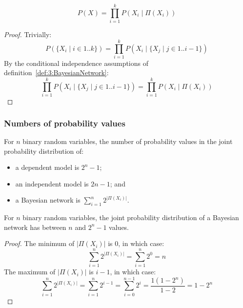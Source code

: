 \begin{thm}
  \label{thm:3:BayesianNetworkJPD}
  \begin{equation}
    P(X) = \prod_{i = 1}^{k} P(X_i \mid \Pi(X_i))
  \end{equation}
  \begin{proof}
    Trivially:
    \begin{equation}
      P(\{ X_i \mid i \in 1 .. k \})
      = \prod_{i = 1}^{k} P(X_i \mid \{ X_j \mid j \in 1 .. i - 1 \})
    \end{equation}
    By the conditional independence assumptions of
    definition~\ref{def:3:BayesianNetwork}:
    \begin{equation}
      \prod_{i = 1}^{k} P(X_i \mid \{ X_j \mid j \in 1 .. i - 1 \})
      = \prod_{i = 1}^{k} P(X_i \mid \Pi(X_i))
    \end{equation}
  \end{proof}
\end{thm}

\subsubsection{Numbers of probability values}

For $n$ binary random variables, the number of probability values in the joint
probability distribution of:
\begin{itemize}
  \item a dependent model is $2^n - 1$;
  \item an independent model is $2n - 1$; and
  \item a Bayesian network is $\sum_{i = 1}^{n} 2^{|\Pi(X_i)|}$.
\end{itemize}

\begin{thm}
  For $n$ binary random variables, the joint probability distribution of a
  Bayesian network has between $n$ and $2^n - 1$ values.
  \begin{proof}
    The minimum of $|\Pi(X_i)|$ is 0, in which case:
    \begin{equation}
      \sum_{i = 1}^{n} 2^{|\Pi(X_i)|} = \sum_{i = 1}^{n} 2^0 = n
    \end{equation}
    The maximum of $|\Pi(X_i)|$ is $i - 1$, in which case:
    \begin{equation}
      \sum_{i = 1}^{n} 2^{|\Pi(X_i)|}
      = \sum_{i = 1}^{n} 2^{i - 1}
      = \sum_{i = 0}^{n - 1} 2^i
      = \frac{1 (1 - 2^n)}{1 - 2}
      = 1 - 2^n
    \end{equation}
  \end{proof}
\end{thm}

